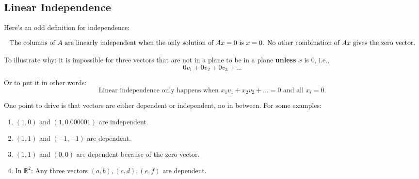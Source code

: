 \subsection{Linear Independence}
Here's an odd definition for independence:

\[
    \text{The columns of \( A \) are linearly independent when the only solution of \( Ax = 0 \) is \( x = 0 \). No other combination of \( Ax \) gives the zero vector.}
\]

To illustrate why: it is impossible for three vectors that are not in a plane to be in a plane \textbf{unless} \( x \) is \( 0 \), i.e.,
\[
    0v_1 + 0v_2 + 0v_3 + \ldots
\]

Or to put it in other words:
\[
    \text{Linear independence only happens when } x_{1}v_1 + x_{2}v_2 + \ldots = 0 \text{ and all } x_i = 0.
\]

One point to drive is that vectors are either dependent or independent, no in between. For some examples:
 \begin{enumerate}
    \item \((1, 0)\) and \((1, 0.000001)\) are independent.
    \item \((1, 1)\) and \((-1, -1)\) are dependent.
    \item \((1, 1)\) and \((0, 0)\) are dependent because of the zero vector.
    \item In \(\mathbb{R}^2\): Any three vectors \((a, b), (c, d), (e, f)\) are dependent.
\end{enumerate}

